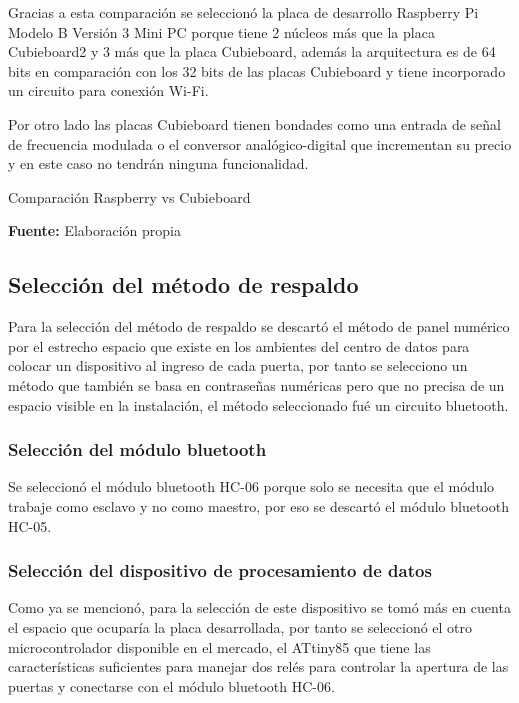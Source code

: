 \documentclass[../principal]{subfiles}
\begin{document}
  Gracias a esta comparación se seleccionó la placa de desarrollo Raspberry Pi Modelo B Versión 3 Mini PC porque tiene 2 núcleos más que la placa Cubieboard2 y 3 más que la placa Cubieboard, además la arquitectura es de 64 bits en comparación con los 32 bits de las placas Cubieboard y tiene incorporado un circuito para conexión Wi-Fi.

  Por otro lado las placas Cubieboard tienen bondades como una entrada de señal de frecuencia modulada o el conversor analógico-digital que incrementan su precio y en este caso no tendrán ninguna funcionalidad.

  \begin{table}[H]
    \caption{Comparación Raspberry vs Cubieboard}
    \label{tab:comparacion_cubieboard_raspberry}
    \centering
    
    \caption*{\textbf{Fuente:} Elaboración propia}
  \end{table}

  \subsection{Selección del método de respaldo}

  Para la selección del método de respaldo se descartó el método de panel numérico por el estrecho espacio que existe en los ambientes del centro de datos para colocar un dispositivo al ingreso de cada puerta, por tanto se selecciono un método que también se basa en contraseñas numéricas pero que no precisa de un espacio visible en la instalación, el método seleccionado fué un circuito bluetooth.

  \subsubsection{Selección del módulo bluetooth}

  Se seleccionó el módulo bluetooth HC-06 porque solo se necesita que el módulo trabaje como esclavo y no como maestro, por eso se descartó el módulo bluetooth HC-05.

  \subsubsection{Selección del dispositivo de procesamiento de datos}

  Como ya se mencionó, para la selección de este dispositivo se tomó más en cuenta el espacio que ocuparía la placa desarrollada, por tanto se seleccionó el otro microcontrolador disponible en el mercado, el ATtiny85 que tiene las características suficientes para manejar dos relés para controlar la apertura de las puertas y conectarse con el módulo bluetooth HC-06.
\end{document}
